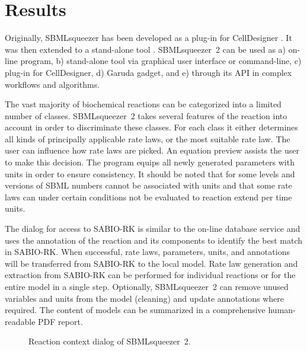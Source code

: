 \documentclass{bioinfo}
\begin{document}
\vspace{-.1cm}
\section{Results}

Originally, SBMLsqueezer has been developed as a plug-in for CellDesigner \citep{Draeger2008}.
It was then extended to a %
stand-alone tool \citep{Draeger2010}.
SBMLsqueezer~2 can be used as
a) on-line program,
b) stand-alone tool via graphical user interface or command-line,
c) plug-in for CellDesigner,
d) Garuda gadget, and
e) through its API in complex workflows and algorithms.

The vast majority of biochemical reactions can be categorized into a limited number of classes.
SBMLsqueezer~2 takes several features of the reaction into account in order to discriminate these classes.
For each class it either determines all kinds of principally applicable rate laws, or the most suitable rate law.
The user can influence how rate laws are picked.
An equation preview assists the user to make this decision.
The program equips all newly generated parameters with units in order to ensure consistency.
It should be noted that for some levels and versions of SBML numbers cannot be associated with units and that some rate laws can under certain conditions not be evaluated to reaction extend per time units.

The dialog for access to SABIO-RK is similar to %
the on-line database service and %
uses the annotation of the reaction and its components to identify the best match in SABIO-RK.
When successful, rate laws, parameters, units, and annotations will be transferred from SABIO-RK to the local model.
%
Rate law generation and extraction from SABIO-RK can be performed for individual reactions or for the entire model in a single step.
Optionally, SBMLsqueezer~2 can remove unused variables and units from the model (cleaning) and update annotations where required.
The content of models can be summarized in a comprehensive human-readable PDF report.

\begin{figure}
\caption[Reaction context dialog of SBMLsqueezer~2]{Reaction context dialog of SBMLsqueezer~2.}\label{fig:SBMLsqueezer}
\vspace{-.2cm}
\end{figure}
\end{document}
